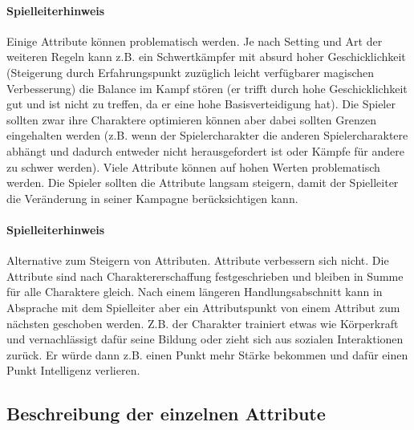 \documentclass{article}
\begin{document}
\begin{mdframed}[hidealllines=true, backgroundcolor=black!10]
\paragraph{Spielleiterhinweis}

Einige Attribute können problematisch werden. Je nach Setting und Art der weiteren Regeln kann z.B. ein
Schwertkämpfer mit absurd hoher Geschicklichkeit (Steigerung durch Erfahrungspunkt zuzüglich leicht verfügbarer
magischen Verbesserung) die Balance im Kampf stören (er trifft durch hohe Geschicklichkeit gut und ist nicht zu
treffen, da er eine hohe Basisverteidigung hat). Die Spieler sollten zwar ihre Charaktere optimieren können aber
dabei sollten Grenzen eingehalten werden (z.B. wenn der Spielercharakter die anderen Spielercharaktere abhängt und
dadurch entweder nicht herausgefordert ist oder Kämpfe für andere zu schwer werden). Viele Attribute können auf
hohen Werten problematisch werden. Die Spieler sollten die Attribute langsam steigern, damit der Spielleiter die
Veränderung in seiner Kampagne berücksichtigen kann.

\end{mdframed}
\begin{mdframed}[hidealllines=true, backgroundcolor=black!10]
\paragraph{Spielleiterhinweis}

Alternative zum Steigern von Attributen. Attribute verbessern sich nicht.
Die Attribute sind nach Charaktererschaffung festgeschrieben und bleiben in Summe für alle Charaktere gleich.
Nach einem längeren Handlungsabschnitt kann in Absprache mit dem Spielleiter aber ein Attributspunkt von einem
Attribut zum nächsten geschoben werden. Z.B. der Charakter trainiert etwas wie Körperkraft und vernachlässigt dafür
seine Bildung oder zieht sich aus sozialen Interaktionen zurück. Er würde dann z.B. einen Punkt mehr Stärke bekommen
und dafür einen Punkt Intelligenz verlieren.

\end{mdframed}
\begin{center}
\subsection{Beschreibung der einzelnen Attribute}
\end{center}
\end{document}
